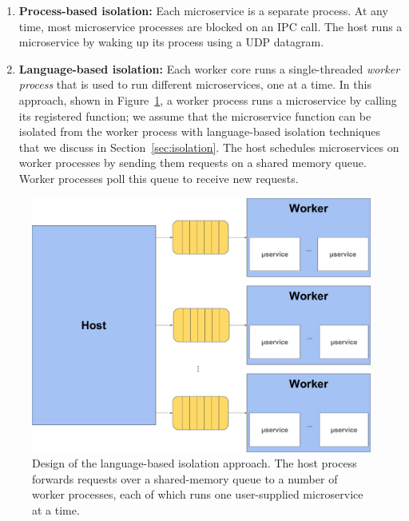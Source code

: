 \begin{enumerate}
\item \textbf{Process-based isolation:} Each microservice is a separate process.
At any time, most microservice processes are blocked on an IPC
call. The host runs a microservice by waking up its process using a UDP datagram.
\item \textbf{Language-based isolation:} Each worker core runs a single-threaded
\emph{worker process} that is used to run different microservices, one at a time.
In this approach, shown in Figure~\ref{fig:sysdesign}, a worker process runs a
microservice by calling its registered
function; we assume that the microservice function can be isolated from the
worker process with language-based isolation techniques that we discuss in
Section~\ref{sec:isolation}. The host schedules microservices on worker processes by
sending them
requests on a shared memory queue. Worker processes poll this queue to receive
new requests.
\end{enumerate}

\begin{figure}
\includegraphics[width=\columnwidth]{figs/system}
\caption{Design of the language-based isolation approach.  The host process forwards
requests over a shared-memory queue to a number of worker processes, each of which
runs one user-supplied microservice at a time.}
\label{fig:sysdesign}
\end{figure}

